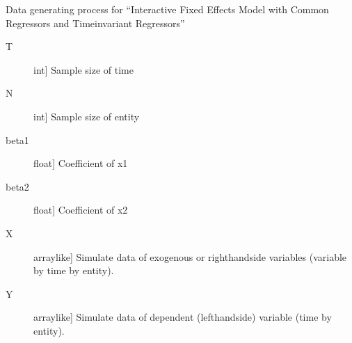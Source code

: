 \documentclass[a4paper,11pt,english]{sphinxmanual}
\begin{document}
\begin{fulllineitems}
\label{\detokenize{analysis:src.analysis.monte_carlo_dgp.dgp_additive_fixed_effects_model}}
\sphinxAtStartPar
Data generating process for “Interactive Fixed Effects Model with Common
Regressors and Time\sphinxhyphen{}invariant Regressors”
\begin{description}
\item[{T}] \leavevmode{[}int{]}
\sphinxAtStartPar
Sample size of time

\item[{N}] \leavevmode{[}int{]}
\sphinxAtStartPar
Sample size of entity

\item[{beta1}] \leavevmode{[}float{]}
\sphinxAtStartPar
Coefficient of x1

\item[{beta2}] \leavevmode{[}float{]}
\sphinxAtStartPar
Coefficient of x2

\end{description}
\begin{description}
\item[{X}] \leavevmode{[}array\sphinxhyphen{}like{]}
\sphinxAtStartPar
Simulate data of exogenous or right\sphinxhyphen{}hand\sphinxhyphen{}side variables (variable by time by
entity).

\item[{Y}] \leavevmode{[}array\sphinxhyphen{}like{]}
\sphinxAtStartPar
Simulate data of dependent (left\sphinxhyphen{}hand\sphinxhyphen{}side) variable (time by entity).


\end{description}
\end{fulllineitems}
\end{document}
